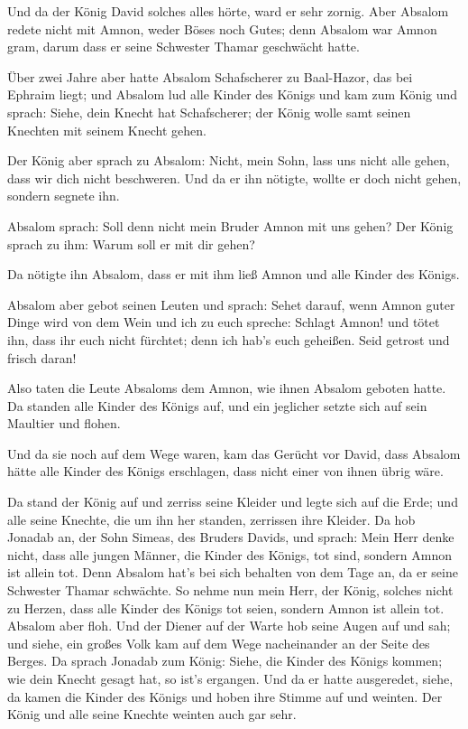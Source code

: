  Und da der König David solches alles hörte, ward er sehr
zornig. Aber Absalom redete nicht mit Amnon, weder Böses noch Gutes;
 denn Absalom war Amnon gram, darum dass er seine Schwester
Thamar geschwächt hatte.

 Über zwei Jahre aber hatte Absalom Schafscherer zu
Baal-Hazor, das bei Ephraim liegt; und Absalom lud alle Kinder des
Königs  und kam zum König und sprach: Siehe, dein Knecht
hat Schafscherer; der König wolle samt seinen Knechten mit seinem Knecht
gehen.

 Der König aber sprach zu Absalom: Nicht, mein Sohn, lass
uns nicht alle gehen, dass wir dich nicht beschweren. Und da er ihn
nötigte, wollte er doch nicht gehen, sondern segnete ihn.

 Absalom sprach: Soll denn nicht mein Bruder Amnon mit uns
gehen? Der König sprach zu ihm: Warum soll er mit dir gehen?

 Da nötigte ihn Absalom, dass er mit ihm ließ Amnon und
alle Kinder des Königs.

 Absalom aber gebot seinen Leuten und sprach: Sehet darauf,
wenn Amnon guter Dinge wird von dem Wein und ich zu euch spreche:
Schlagt Amnon! und tötet ihn, dass ihr euch nicht fürchtet; denn ich
hab's euch geheißen. Seid getrost und frisch daran!

 Also taten die Leute Absaloms dem Amnon, wie ihnen Absalom
geboten hatte. Da standen alle Kinder des Königs auf, und ein jeglicher
setzte sich auf sein Maultier und flohen.

 Und da sie noch auf dem Wege waren, kam das Gerücht vor
David, dass Absalom hätte alle Kinder des Königs erschlagen, dass nicht
einer von ihnen übrig wäre.

 Da stand der König auf und zerriss seine Kleider und legte
sich auf die Erde; und alle seine Knechte, die um ihn her standen,
zerrissen ihre Kleider.  Da hob Jonadab an, der Sohn
Simeas, des Bruders Davids, und sprach: Mein Herr denke nicht, dass alle
jungen Männer, die Kinder des Königs, tot sind, sondern Amnon ist allein
tot. Denn Absalom hat's bei sich behalten von dem Tage an, da er seine
Schwester Thamar schwächte.  So nehme nun mein Herr, der
König, solches nicht zu Herzen, dass alle Kinder des Königs tot seien,
sondern Amnon ist allein tot.  Absalom aber floh. Und der
Diener auf der Warte hob seine Augen auf und sah; und siehe, ein großes
Volk kam auf dem Wege nacheinander an der Seite des Berges.
 Da sprach Jonadab zum König: Siehe, die Kinder des Königs
kommen; wie dein Knecht gesagt hat, so ist's ergangen.  Und
da er hatte ausgeredet, siehe, da kamen die Kinder des Königs und hoben
ihre Stimme auf und weinten. Der König und alle seine Knechte weinten
auch gar sehr.

